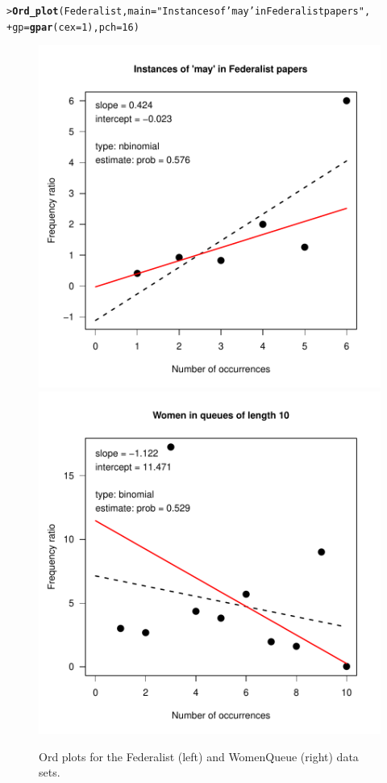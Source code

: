 \documentclass[10pt,krantz2]{krantz}\usepackage[]{graphicx}\usepackage[]{color}
\makeatletter
\newcommand{\hlnum}[1]{\textcolor[rgb]{0.686,0.059,0.569}{#1}}%
\newcommand{\hlstr}[1]{\textcolor[rgb]{0.192,0.494,0.8}{#1}}%
\newcommand{\hlstd}[1]{\textcolor[rgb]{0.345,0.345,0.345}{#1}}%
\newcommand{\hlkwc}[1]{\textcolor[rgb]{0.333,0.667,0.333}{#1}}%
\newcommand{\hlkwd}[1]{\textcolor[rgb]{0.737,0.353,0.396}{\textbf{#1}}}%
\newenvironment{kframe}{%
 \def\at@end@of@kframe{}%
 \ifinner\ifhmode%
  \def\at@end@of@kframe{\end{minipage}}%
  \begin{minipage}{\columnwidth}%
 \fi\fi%
 \def\FrameCommand##1{\hskip\@totalleftmargin \hskip-\fboxsep
 \colorbox{shadecolor}{##1}\hskip-\fboxsep
     \hskip-\linewidth \hskip-\@totalleftmargin \hskip\columnwidth}%
 \MakeFramed {\advance\hsize-\width
   \@totalleftmargin\z@ \linewidth\hsize
   \@setminipage}}%
 {\par\unskip\endMakeFramed%
 \at@end@of@kframe}
\newenvironment{knitrout}{}{} %
\renewenvironment{knitrout}{\small\renewcommand{\baselinestretch}{.85}}{} %
\makeatother
\begin{document}
\begin{knitrout}
\color{fgcolor}\begin{kframe}
\begin{alltt}
\hlstd{> }\hlkwd{Ord_plot}\hlstd{(Federalist,} \hlkwc{main} \hlstd{=} \hlstr{"Instances of 'may' in Federalist papers"}\hlstd{,}
\hlstd{+ }         \hlkwc{gp} \hlstd{=} \hlkwd{gpar}\hlstd{(}\hlkwc{cex} \hlstd{=} \hlnum{1}\hlstd{),} \hlkwc{pch} \hlstd{=} \hlnum{16}\hlstd{)}
\end{alltt}
\end{kframe}
\end{knitrout}

\begin{knitrout}
\color{fgcolor}\begin{figure}[!htbp]

\centerline{\includegraphics[width=.48\textwidth]{ch03/fig/ordplot3plot-1} 
\includegraphics[width=.48\textwidth]{ch03/fig/ordplot3plot-2} }

\caption[Ord plots for the Federalist (left) and WomenQueue (right) data sets]{Ord plots for the Federalist (left) and WomenQueue (right) data sets.\label{fig:ordplot3plot}}
\end{figure}


\end{knitrout}
\end{document}
